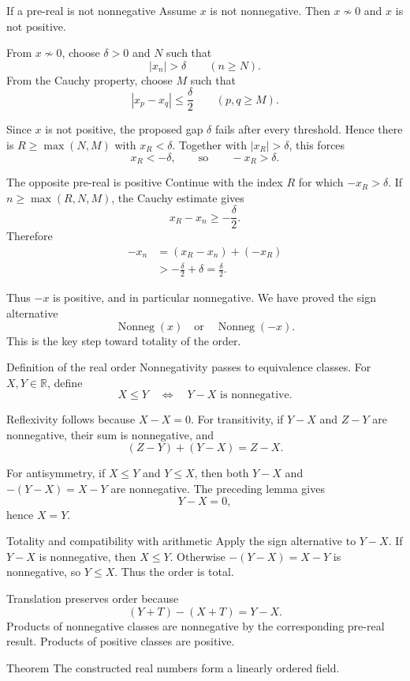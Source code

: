 \documentclass[aspectratio=169,11pt]{beamer}
\newcommand{\R}{\mathbb R}
\begin{document}
\begin{frame}{If a pre-real is not nonnegative}
  Assume \(x\) is not nonnegative.  Then \(x\not\sim0\) and \(x\) is not
  positive.

  From \(x\not\sim0\), choose \(\delta>0\) and \(N\) such that
  \[
    |x_n|>\delta\qquad(n\ge N).
  \]
  From the Cauchy property, choose \(M\) such that
  \[
    |x_p-x_q|\le\frac\delta2
    \qquad(p,q\ge M).
  \]

  Since \(x\) is not positive, the proposed gap \(\delta\) fails after every
  threshold.  Hence there is \(R\ge\max(N,M)\) with \(x_R<\delta\).  Together
  with \(|x_R|>\delta\), this forces
  \[
    x_R<-\delta,
    \qquad\text{so}\qquad
    -x_R>\delta.
  \]
\end{frame}

\begin{frame}{The opposite pre-real is positive}
  Continue with the index \(R\) for which \(-x_R>\delta\).  If
  \(n\ge\max(R,N,M)\), the Cauchy estimate gives
  \[
    x_R-x_n\ge-\frac\delta2.
  \]
  Therefore
  \begin{align*}
    -x_n
      &=(x_R-x_n)+(-x_R)\\
      &>-\frac\delta2+\delta
       =\frac\delta2.
  \end{align*}

  Thus \(-x\) is positive, and in particular nonnegative.  We have proved
  the sign alternative
  \[
    \boxed{\operatorname{Nonneg}(x)
      \quad\text{or}\quad
      \operatorname{Nonneg}(-x).}
  \]
  This is the key step toward totality of the order.
\end{frame}

\begin{frame}{Definition of the real order}
  Nonnegativity passes to equivalence classes.  For \(X,Y\in\R\), define
  \[
    \boxed{X\le Y
      \quad\Longleftrightarrow\quad
      Y-X\text{ is nonnegative}.}
  \]

  Reflexivity follows because \(X-X=0\).  For transitivity, if \(Y-X\) and
  \(Z-Y\) are nonnegative, their sum is nonnegative, and
  \[
    (Z-Y)+(Y-X)=Z-X.
  \]

  For antisymmetry, if \(X\le Y\) and \(Y\le X\), then both \(Y-X\) and
  \(-(Y-X)=X-Y\) are nonnegative.  The preceding lemma gives
  \[
    Y-X=0,
  \]
  hence \(X=Y\).
\end{frame}

\begin{frame}{Totality and compatibility with arithmetic}
  Apply the sign alternative to \(Y-X\).  If \(Y-X\) is nonnegative, then
  \(X\le Y\).  Otherwise \(-(Y-X)=X-Y\) is nonnegative, so \(Y\le X\).
  Thus the order is total.

  Translation preserves order because
  \[
    (Y+T)-(X+T)=Y-X.
  \]
  Products of nonnegative classes are nonnegative by the corresponding
  pre-real result.  Products of positive classes are positive.

  \begin{block}{Theorem}
    The constructed real numbers form a linearly ordered field.
  \end{block}
\end{frame}
\end{document}
